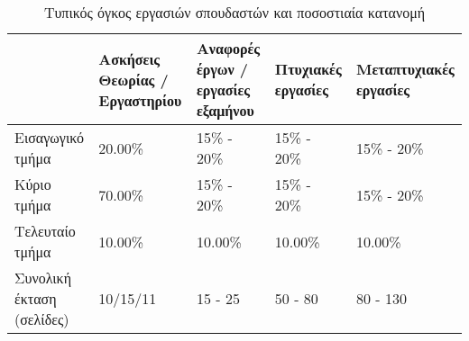 \begin{table}[ht]
\centering
\begin{tabular}{ | p{2.5cm} | p{2.3cm} | p{2.3cm} | p{2.3cm} | p{3.2cm} | }
\hline
 & Ασκήσεις Θεωρίας / Εργαστηρίου & Αναφορές  έργων / εργασίες εξαμήνου & Πτυχιακές εργασίες & Μεταπτυχιακές εργασίες \\ \hline
Εισαγωγικό τμήμα & 20.00\% & 15\% - 20\% & 15\% - 20\% & 15\% - 20\% \\ \hline
Κύριο τμήμα & 70.00\% & 15\% - 20\% & 15\% - 20\% & 15\% - 20\% \\ \hline
Τελευταίο τμήμα & 10.00\% & 10.00\% & 10.00\% & 10.00\% \\ \hline
Συνολική έκταση (σελίδες) & 10/15/11 & 15 - 25 & 50 - 80 & 80 - 130 \\ \hline
\end{tabular}
\caption{Τυπικός όγκος εργασιών σπουδαστών και ποσοστιαία κατανομή}
\label{tab:importance}
\end{table}
